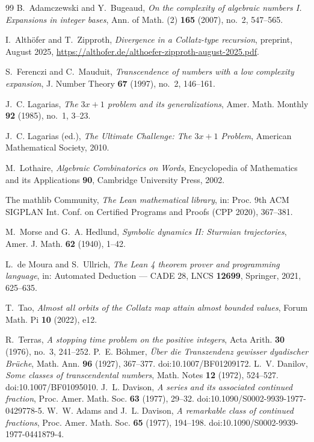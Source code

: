 \documentclass[11pt,a4paper]{article}
\theoremstyle{plain}
\theoremstyle{definition}
\begin{document}
\begin{thebibliography}{99}
 B.~Adamczewski and Y.~Bugeaud,
\emph{On the complexity of algebraic numbers I. Expansions in integer bases},
Ann. of Math. (2) \textbf{165} (2007), no.~2, 547--565.

 I.~Alth\"ofer and T.~Zipproth,
\emph{Divergence in a Collatz-type recursion}, preprint, August 2025, \url{https://althofer.de/althoefer-zipproth-august-2025.pdf}.

 S.~Ferenczi and C.~Mauduit,
\emph{Transcendence of numbers with a low complexity expansion},
J. Number Theory \textbf{67} (1997), no.~2, 146--161.

 J.~C. Lagarias,
\emph{The $3x+1$ problem and its generalizations},
Amer. Math. Monthly \textbf{92} (1985), no.~1, 3--23.

 J.~C. Lagarias (ed.),
\emph{The Ultimate Challenge: The $3x+1$ Problem}, American Mathematical Society, 2010.

 M.~Lothaire,
\emph{Algebraic Combinatorics on Words}, Encyclopedia of Mathematics and its Applications
\textbf{90}, Cambridge University Press, 2002.

 The mathlib Community,
\emph{The Lean mathematical library}, in: Proc. 9th ACM SIGPLAN Int. Conf. on Certified
Programs and Proofs (CPP 2020), 367--381.

 M.~Morse and G.~A. Hedlund,
\emph{Symbolic dynamics II: Sturmian trajectories},
Amer. J. Math. \textbf{62} (1940), 1--42.

 L.~de Moura and S.~Ullrich,
\emph{The Lean 4 theorem prover and programming language},
in: Automated Deduction --- CADE 28, LNCS \textbf{12699}, Springer, 2021, 625--635.

 T.~Tao,
\emph{Almost all orbits of the Collatz map attain almost bounded values},
Forum Math. Pi \textbf{10} (2022), e12.

 R.~Terras,
\emph{A stopping time problem on the positive integers},
Acta Arith. \textbf{30} (1976), no.~3, 241--252.
 P.~E. B\"ohmer, \emph{\"Uber die Transzendenz gewisser dyadischer Br\"uche},
Math. Ann. \textbf{96} (1927), 367--377. doi:10.1007/BF01209172.
 L.~V. Danilov, \emph{Some classes of transcendental numbers},
Math. Notes \textbf{12} (1972), 524--527. doi:10.1007/BF01095010.
 J.~L. Davison, \emph{A series and its associated continued fraction},
Proc. Amer. Math. Soc. \textbf{63} (1977), 29--32. doi:10.1090/S0002-9939-1977-0429778-5.
 W.~W. Adams and J.~L. Davison, \emph{A remarkable class of continued
fractions}, Proc. Amer. Math. Soc. \textbf{65} (1977), 194--198.
doi:10.1090/S0002-9939-1977-0441879-4.
\end{thebibliography}
\end{document}
